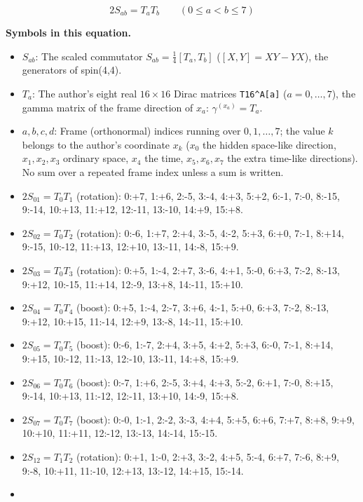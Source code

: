 \documentclass[
  10pt,
]{article}
\begin{document}
\[
2S_{ab} = T_aT_b\qquad (0 \le a < b \le 7)
\]

\textbf{Symbols in this equation.}

\begin{itemize}
\item
  \(S_{ab}\): The scaled commutator \(S_{ab} = \tfrac14[T_a, T_b]\)
  (\([X, Y] = XY - YX\)), the generators of spin(4,4).
\item
  \(T_a\): The author's eight real \(16 \times 16\) Dirac matrices
  \texttt{T16\^{}A{[}a{]}} (\(a = 0, \dots, 7\)), the gamma matrix of
  the frame direction of \(x_a\): \(\gamma^{(x_a)} = T_a\).
\item
  \(a, b, c, d\): Frame (orthonormal) indices running over
  \(0, 1, \dots, 7\); the value \(k\) belongs to the author's coordinate
  \(x_k\) (\(x_0\) the hidden space-like direction, \(x_1, x_2, x_3\)
  ordinary space, \(x_4\) the time, \(x_5, x_6, x_7\) the extra
  time-like directions). No sum over a repeated frame index unless a sum
  is written.
\item
  \(2S_{01} = T_0T_1\) (rotation): 0:+7, 1:+6, 2:-5, 3:-4, 4:+3, 5:+2,
  6:-1, 7:-0, 8:-15, 9:-14, 10:+13, 11:+12, 12:-11, 13:-10, 14:+9,
  15:+8.
\item
  \(2S_{02} = T_0T_2\) (rotation): 0:-6, 1:+7, 2:+4, 3:-5, 4:-2, 5:+3,
  6:+0, 7:-1, 8:+14, 9:-15, 10:-12, 11:+13, 12:+10, 13:-11, 14:-8,
  15:+9.
\item
  \(2S_{03} = T_0T_3\) (rotation): 0:+5, 1:-4, 2:+7, 3:-6, 4:+1, 5:-0,
  6:+3, 7:-2, 8:-13, 9:+12, 10:-15, 11:+14, 12:-9, 13:+8, 14:-11,
  15:+10.
\item
  \(2S_{04} = T_0T_4\) (boost): 0:+5, 1:-4, 2:-7, 3:+6, 4:-1, 5:+0,
  6:+3, 7:-2, 8:-13, 9:+12, 10:+15, 11:-14, 12:+9, 13:-8, 14:-11,
  15:+10.
\item
  \(2S_{05} = T_0T_5\) (boost): 0:-6, 1:-7, 2:+4, 3:+5, 4:+2, 5:+3,
  6:-0, 7:-1, 8:+14, 9:+15, 10:-12, 11:-13, 12:-10, 13:-11, 14:+8,
  15:+9.
\item
  \(2S_{06} = T_0T_6\) (boost): 0:-7, 1:+6, 2:-5, 3:+4, 4:+3, 5:-2,
  6:+1, 7:-0, 8:+15, 9:-14, 10:+13, 11:-12, 12:-11, 13:+10, 14:-9,
  15:+8.
\item
  \(2S_{07} = T_0T_7\) (boost): 0:-0, 1:-1, 2:-2, 3:-3, 4:+4, 5:+5,
  6:+6, 7:+7, 8:+8, 9:+9, 10:+10, 11:+11, 12:-12, 13:-13, 14:-14,
  15:-15.
\item
  \(2S_{12} = T_1T_2\) (rotation): 0:+1, 1:-0, 2:+3, 3:-2, 4:+5, 5:-4,
  6:+7, 7:-6, 8:+9, 9:-8, 10:+11, 11:-10, 12:+13, 13:-12, 14:+15,
  15:-14.
\item

\end{itemize}
\end{document}
